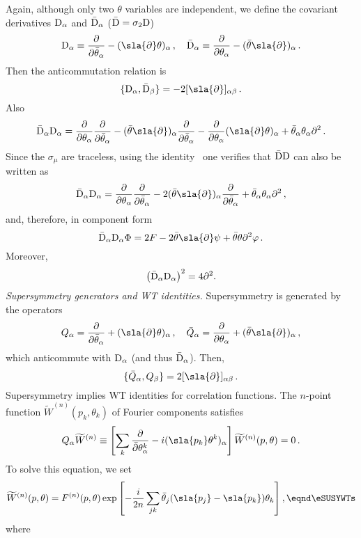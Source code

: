 Again, although only two $\theta$ variables are independent, we define the
covariant derivatives ${\rm D}_\alpha$ and $\bar {\rm D}_\alpha$ ($\bar {\rm D}=\sigma_2 {\rm D}$)
$$ {\rm D}_\alpha \equiv
{\partial\over\partial\bar\theta_\alpha}-(\sla{\partial} \theta)_\alpha \,,\quad
\bar {\rm D}_\alpha \equiv{\partial \over\partial \theta_\alpha}
-(\bar\theta\sla{\partial})_\alpha \,. $$
Then the anticommutation relation is
$$\{{\rm D}_\alpha,\bar {\rm D}_\beta\}=-2
[\sla{\partial}]_{\alpha\beta}\,.$$
Also
$$\bar {\rm D}_\alpha {\rm D}_\alpha={\partial\over\partial\theta_\alpha}
{\partial\over\partial\bar\theta_\alpha}-(\bar\theta\sla{\partial})_\alpha
{\partial\over\partial\bar\theta_\alpha}
-{\partial\over\partial\theta_\alpha}(\sla{\partial}\theta)_\alpha
+\bar\theta_\alpha\theta_\alpha\partial^2\,.$$
Since the $\sigma_\mu$ are traceless, using the identity \esigtetii\ one
verifies that $\bar {\rm D} {\rm D}$ can also be written as
$$\bar {\rm D}_\alpha {\rm D}_\alpha={\partial\over\partial\theta_\alpha}
{\partial\over\partial\bar\theta_\alpha}-2(\bar\theta\sla{\partial})_\alpha
{\partial\over\partial\bar\theta_\alpha}
+\bar\theta_\alpha\theta_\alpha\partial^2\,,$$
and, therefore, in component form
$$\bar {\rm D}_\alpha {\rm D}_\alpha \Phi=2F-2\bar\theta\sla{\partial}\psi
 +\bar\theta\theta \partial^2\varphi\,.$$
Moreover,
$$\left(\bar {\rm D}_\alpha {\rm D}_\alpha\right)^2=4\partial ^2.$$
\medskip
{\it Supersymmetry generators and WT identities.} Supersymmetry is generated
by the operators
$$  Q_\alpha={\partial\over\partial\bar\theta_\alpha}+(\sla{\partial} \theta)_\alpha      \,,\quad \bar Q_\alpha ={\partial \over\partial \theta_\alpha}
+(\bar\theta\sla{\partial})_\alpha \,, $$
which anticommute with
${\rm D}_\alpha$ (and thus $\bar {\rm D}_\alpha$).
Then,
$$\{\bar Q_\alpha, Q_\beta\}=2[\sla{\partial}]_{\alpha\beta}\,.$$
Supersymmetry implies WT identities for correlation functions. The $n$-point
function $ \widetilde W^{(n)}(p_k,\theta_k)$ of Fourier components satisfies
$$Q_\alpha \widetilde W^{(n)}\equiv \left[\sum_k {\partial \over\bar \partial \theta^k_\alpha}
-i( \sla{p_k}\theta^k)_\alpha\right] \widetilde W^{(n)}(p,\theta)=0\,.$$
To solve this equation, we set
$$\widetilde W^{(n)}(p,\theta)=F^{(n)}(p,\theta)\exp\left[-{i\over2n}\sum_{jk}\bar\theta_j
(\sla{p_j}-\sla{p_k})\theta_k\right], \eqnd\eSUSYWTs $$ where
